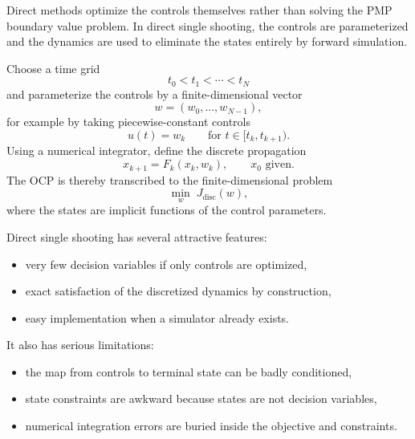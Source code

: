 \begin{intuition}
	Direct methods optimize the controls themselves rather than solving the PMP boundary value problem. In direct single shooting, the controls are parameterized and the dynamics are used to eliminate the states entirely by forward simulation.
\end{intuition}

\begin{definition}\label{def:l5-direct-single-shooting}
	Choose a time grid
	\[
		t_0<t_1<\cdots<t_N
	\]
	and parameterize the controls by a finite-dimensional vector
	\[
		w=(w_0,\dots,w_{N-1}),
	\]
	for example by taking piecewise-constant controls
	\[
		u(t)=w_k
		\qquad \text{for } t \in [t_k,t_{k+1}).
	\]
	Using a numerical integrator, define the discrete propagation
	\[
		x_{k+1}=F_k(x_k,w_k),
		\qquad
		x_0 \text{ given}.
	\]
	The OCP is thereby transcribed to the finite-dimensional problem
	\[
		\min_w \; J_{\text{disc}}(w),
	\]
	where the states are implicit functions of the control parameters.
\end{definition}

\begin{algorithm}[H]
	\DontPrintSemicolon
	\caption{Direct Single Shooting}
\label{alg:l5-direct-single-shooting}
\end{algorithm}

\begin{remark}
	Direct single shooting has several attractive features:
	\begin{itemize}
		\item very few decision variables if only controls are optimized,
		\item exact satisfaction of the discretized dynamics by construction,
		\item easy implementation when a simulator already exists.
	\end{itemize}
	It also has serious limitations:
	\begin{itemize}
		\item the map from controls to terminal state can be badly conditioned,
		\item state constraints are awkward because states are not decision variables,
		\item numerical integration errors are buried inside the objective and constraints.
	\end{itemize}
\end{remark}

